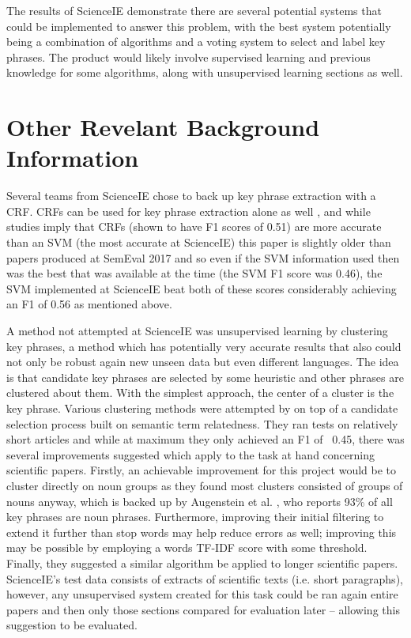 The results of ScienceIE demonstrate there are several potential systems that could be implemented to answer this problem, with the best system potentially being a combination of algorithms and a voting system to select and label key phrases. The product would likely involve supervised learning and previous knowledge for some algorithms, along with unsupervised learning sections as well.

\section{Other Revelant Background Information}

Several teams from ScienceIE chose to back up key phrase extraction with a CRF. CRFs can be used for key phrase extraction alone as well \cite{Zhang2008}, and while studies imply that CRFs (shown to have F1 scores of 0.51) are more accurate than an SVM (the most accurate at ScienceIE) this paper is slightly older than papers produced at SemEval 2017 and so even if the SVM information used then was the best that was available at the time (the SVM F1 score was 0.46), the SVM implemented at ScienceIE beat both of these scores considerably achieving an F1 of 0.56 as mentioned above.

A method not attempted at ScienceIE was unsupervised learning by clustering key phrases, a method which has potentially very accurate results that also could not only be robust again new unseen data but even different languages. The idea is that candidate key phrases are selected by some heuristic and other phrases are clustered about them. With the simplest approach, the center of a cluster is the key phrase. Various clustering methods were attempted by \cite{Liu2009} on top of a candidate selection process built on semantic term relatedness. They ran tests on relatively short articles and while at maximum they only achieved an F1 of ~0.45, there was several improvements suggested which apply to the task at hand concerning scientific papers. Firstly, an achievable improvement for this project would be to cluster directly on noun groups as they found most clusters consisted of groups of nouns anyway, which is backed up by Augenstein et al. \cite{Augenstein2017}, who reports 93\% of all key phrases are noun phrases. Furthermore, improving their initial filtering to extend it further than stop words may help reduce errors as well; improving this may be possible by employing a words TF-IDF score with some threshold. Finally, they suggested a similar algorithm be applied to longer scientific papers. ScienceIE’s test data consists of extracts of scientific texts (i.e. short paragraphs), however, any unsupervised system created for this task could be ran again entire papers and then only those sections compared for evaluation later – allowing this suggestion to be evaluated.

